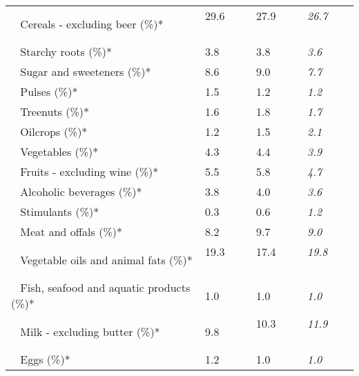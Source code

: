 \begin{tabular}{L{3.9cm} R{1cm} R{1cm} R{1cm}}
	 ~ Cereals - excluding beer (\%)* & 29.6 ~ \ \ & 27.9 ~ \ \ & \textit{26.7} ~ \ \ \\ 
	 ~ Starchy roots (\%)* & 3.8 ~ \ \ & 3.8 ~ \ \ & \textit{3.6} ~ \ \ \\ 
	 ~ Sugar and sweeteners (\%)* & 8.6 ~ \ \ & 9.0 ~ \ \ & \textit{7.7} ~ \ \ \\ 
	 ~ Pulses (\%)* & 1.5 ~ \ \ & 1.2 ~ \ \ & \textit{1.2} ~ \ \ \\ 
	 ~ Treenuts (\%)* & 1.6 ~ \ \ & 1.8 ~ \ \ & \textit{1.7} ~ \ \ \\ 
	 ~ Oilcrops (\%)* & 1.2 ~ \ \ & 1.5 ~ \ \ & \textit{2.1} ~ \ \ \\ 
	 ~ Vegetables (\%)* & 4.3 ~ \ \ & 4.4 ~ \ \ & \textit{3.9} ~ \ \ \\ 
	 ~ Fruits - excluding wine (\%)* & 5.5 ~ \ \ & 5.8 ~ \ \ & \textit{4.7} ~ \ \ \\ 
	 ~ Alcoholic beverages (\%)* & 3.8 ~ \ \ & 4.0 ~ \ \ & \textit{3.6} ~ \ \ \\ 
	 ~ Stimulants (\%)* & 0.3 ~ \ \ & 0.6 ~ \ \ & \textit{1.2} ~ \ \ \\ 
	 ~ Meat and offals (\%)* & 8.2 ~ \ \ & 9.7 ~ \ \ & \textit{9.0} ~ \ \ \\ 
	 ~ Vegetable oils and animal fats (\%)* & 19.3 ~ \ \ & 17.4 ~ \ \ & \textit{19.8} ~ \ \ \\ 
	 ~ Fish, seafood and aquatic products (\%)* & 1.0 ~ \ \ & 1.0 ~ \ \ & \textit{1.0} ~ \ \ \\ 
	 ~ Milk - excluding butter (\%)* & 9.8 ~ \ \ & 10.3 ~ \ \ & \textit{11.9} ~ \ \ \\ 
	 ~ Eggs (\%)* & 1.2 ~ \ \ & 1.0 ~ \ \ & \textit{1.0} ~ \ \ \\ 
       \toprule
      \end{tabular}
      \clearpage
{}

